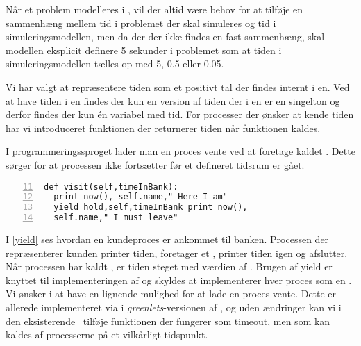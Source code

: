 Når et problem modelleres i \des, vil der altid være behov for at
tilføje en sammenhæng mellem tid i problemet der skal simuleres og tid i simuleringsmodellen, men da
der der ikke findes en fast sammenhæng, skal modellen  eksplicit
definere 5 sekunder i problemet som at tiden i simuleringsmodellen tælles op med 5, 0.5 eller 0.05.

Vi har valgt at repræsentere tiden som et positivt tal der findes internt i \sched en.
Ved at have tiden i  \sched en findes der kun en version af tiden der i \sched en er en singelton og derfor findes der kun
én variabel med tid. For processer der ønsker at kende tiden har vi
introduceret funktionen  der returnerer tiden når funktionen kaldes. 


I programmeringssproget \simpy lader man en proces vente ved at
foretage kaldet . Dette  sørger for at processen ikke
fortsætter før et defineret tidsrum er gået.

\begin{lstlisting}[firstnumber=11 , stepnumber=2, numbers=left,float=hbtp, label=yield, caption= Et yield i \simpy (Taget fra Bank05.py i eksemplet fra \simpy)] 
def visit(self,timeInBank): 
  print now(), self.name," Here I am" 
  yield hold,self,timeInBank print now(),
  self.name," I must leave" 
\end{lstlisting}

I \cref{yield} ses hvordan en kundeproces er ankommet til banken. Processen der repræsenterer kunden printer tiden, foretager et , printer tiden igen og afslutter. 
 Når processen har kaldt , er tiden steget med værdien af . Brugen af yield er knyttet til implementeringen af \simpy og skyldes at \simpy implementerer hver proces som en . Vi ønsker i \pycsp at have en
lignende mulighed for at lade en proces vente. Dette er allerede implementeret via  i \emph{greenlets}-versionen af \pycsp, og uden ændringer kan vi
 i den eksisterende \sched ~tilføje funktionen  der fungerer som timeout, men som kan kaldes af processerne
på et vilkårligt tidspunkt. 

